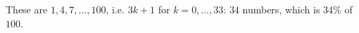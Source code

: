 These are $1,4,7,\dots,100$, i.e. $3k+1$ for $k=0,\dots,33$: $34$ numbers, which is $\boxed{34\%}$ of $100$.
